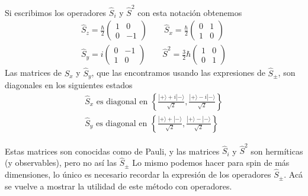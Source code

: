 \documentclass{book}
\numberwithin{equation}{section} %
\begin{document}
Si escribimos los operadores $\hat{S}_i$ y $\hat{S}^2$ con esta notación obtenemos
\begin{equation}
    \begin{gathered}
        \hat{S}_z = \frac{\hbar}{2} \begin{pmatrix} 1 & 0 \\ 0 & -1 \end{pmatrix} \qquad
        \hat{S}_x = \frac{\hbar}{2}\begin{pmatrix} 0 & 1 \\ 1 & 0 \end{pmatrix}\\ 
    \hat{S}_y = i \begin{pmatrix} 0 & -1 \\ 1 & 0 \end{pmatrix} \qquad
    \hat{S}^2 = \frac{3}{2}\hbar \begin{pmatrix} 1 & 0 \\ 0 & 1 \end{pmatrix}
\end{gathered}
\end{equation}
Las matrices de $\hat{S}_x$ y $\hat{S}_y$, que las encontramos usando las expresiones de $\hat{S}_\pm$, son diagonales en los siguientes estados
\begin{equation}
    \begin{gathered}
    \hat{S}_x \text{ es  diagonal en } \left\{\frac{|+ \rangle + i |-\rangle}{\sqrt{2}}, \frac{|+\rangle - i |-\rangle}{\sqrt{2}}\right\} \\
    \hat{S}_y \text{ es  diagonal en } \left\{\frac{|+\rangle + |-\rangle}{\sqrt{2}}, \frac{|+\rangle - |-\rangle}{\sqrt{2}}\right\}
\end{gathered}
\end{equation}

Estas matrices son conocidas como de Pauli, y las matrices $\hat{S}_i$ y $\hat{S}^2$ son hermíticas (y observables), pero no así las $\hat{S}_\pm$
Lo mismo podemos hacer para spin de más dimensiones, lo único es necesario recordar la expresión de los operadores $\hat{S}_\pm$.
Acá se vuelve a mostrar la utilidad de este método con operadores.
\end{document}
